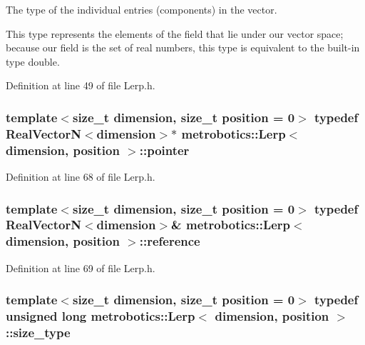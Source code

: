\-The type of the individual entries (components) in the vector. 

\-This type represents the elements of the field that lie under our vector space; because our field is the set of real numbers, this type is equivalent to the built-\/in type {\ttfamily double}. 

\-Definition at line 49 of file \-Lerp.\-h.

\hypertarget{classmetrobotics_1_1Lerp_a77fb99f54e951d0e63c43e3249719e97}{
\subsubsection[{pointer}]{\setlength{\rightskip}{0pt plus 5cm}template$<$size\-\_\-t dimension, size\-\_\-t position = 0$>$ typedef {\bf \-Real\-Vector\-N}$<$dimension$>$$\ast$ {\bf metrobotics\-::\-Lerp}$<$ dimension, position $>$\-::{\bf pointer}}}\label{classmetrobotics_1_1Lerp_a77fb99f54e951d0e63c43e3249719e97}


\-Definition at line 68 of file \-Lerp.\-h.

\hypertarget{classmetrobotics_1_1Lerp_ae64c70e9dc4c0c99af76b155f6786ec0}{
\subsubsection[{reference}]{\setlength{\rightskip}{0pt plus 5cm}template$<$size\-\_\-t dimension, size\-\_\-t position = 0$>$ typedef {\bf \-Real\-Vector\-N}$<$dimension$>$\& {\bf metrobotics\-::\-Lerp}$<$ dimension, position $>$\-::{\bf reference}}}\label{classmetrobotics_1_1Lerp_ae64c70e9dc4c0c99af76b155f6786ec0}


\-Definition at line 69 of file \-Lerp.\-h.

\hypertarget{classmetrobotics_1_1Lerp_a10263c93dd1cabed5b5c06585f13c272}{
\subsubsection[{size\-\_\-type}]{\setlength{\rightskip}{0pt plus 5cm}template$<$size\-\_\-t dimension, size\-\_\-t position = 0$>$ typedef unsigned long {\bf metrobotics\-::\-Lerp}$<$ dimension, position $>$\-::{\bf size\-\_\-type}}}\label{classmetrobotics_1_1Lerp_a10263c93dd1cabed5b5c06585f13c272}


